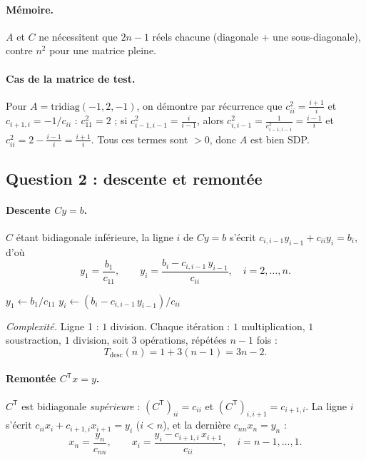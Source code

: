\documentclass[11pt,a4paper]{article}
\newcommand{\T}{\mathsf{T}}
\begin{document}
\paragraph{Mémoire.} $A$ et $C$ ne nécessitent que $2n-1$ réels chacune
(diagonale + une sous-diagonale), contre $n^2$ pour une matrice pleine.

\paragraph{Cas de la matrice de test.} Pour $A=\mathrm{tridiag}(-1,2,-1)$, on démontre par récurrence que
$c_{ii}^2=\frac{i+1}{i}$ et $c_{i+1,i}=-1/c_{ii}$ :
$c_{11}^2=2$ ; si $c_{i-1,i-1}^2=\frac{i}{i-1}$, alors $c_{i,i-1}^2=\frac{1}{c_{i-1,i-1}^2}=\frac{i-1}{i}$ et
$c_{ii}^2=2-\frac{i-1}{i}=\frac{i+1}{i}$. Tous ces termes sont $>0$, donc $A$ est bien SDP.

\subsection{Question 2 : descente et remontée}

\paragraph{Descente $Cy=b$.} $C$ étant bidiagonale inférieure, la ligne $i$ de $Cy=b$ s'écrit
$c_{i,i-1}y_{i-1}+c_{ii}y_i=b_i$, d'où
\[
\boxed{\;y_1=\frac{b_1}{c_{11}},\qquad y_i=\frac{b_i-c_{i,i-1}\,y_{i-1}}{c_{ii}},\quad i=2,\dots,n.\;}
\]

\begin{algorithm}[h]
\caption{Descente $Cy=b$}
\begin{algorithmic}[1]
\State $y_1\gets b_1/c_{11}$
  \State $y_i\gets (b_i-c_{i,i-1}\,y_{i-1})/c_{ii}$
\EndFor
\end{algorithmic}
\end{algorithm}

\emph{Complexité.} Ligne 1 : $1$ division. Chaque itération : $1$ multiplication, $1$ soustraction, $1$ division, soit $3$ opérations,
répétées $n-1$ fois :
\[
T_{\mathrm{desc}}(n)=1+3(n-1)=\boxed{3n-2}.
\]

\paragraph{Remontée $C^\T x=y$.} $C^\T$ est bidiagonale \emph{supérieure} :
$(C^\T)_{ii}=c_{ii}$ et $(C^\T)_{i,i+1}=c_{i+1,i}$. La ligne $i$ s'écrit
$c_{ii}x_i+c_{i+1,i}x_{i+1}=y_i$ ($i<n$), et la dernière $c_{nn}x_n=y_n$ :
\[
\boxed{\;x_n=\frac{y_n}{c_{nn}},\qquad x_i=\frac{y_i-c_{i+1,i}\,x_{i+1}}{c_{ii}},\quad i=n-1,\dots,1.\;}
\]
\end{document}
